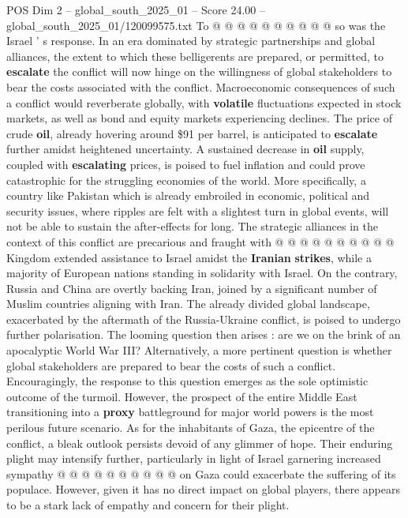 \begin{textsample}{POS Dim 2 – global\_south\_2025\_01 – Score 24.00 – global\_south\_2025\_01/120099575.txt}
To @ @ @ @ @ @ @ @ @ @ so was the Israel ' s response.
In an era dominated by strategic partnerships and global alliances, the extent to which these belligerents are prepared, or permitted, to \textbf{escalate} the conflict will now hinge on the willingness of global stakeholders to bear the costs associated with the conflict.
Macroeconomic consequences of such a conflict would reverberate globally, with \textbf{volatile} fluctuations expected in stock markets, as well as bond and equity markets experiencing declines.
The price of crude \textbf{oil}, already hovering around \$91 per barrel, is anticipated to \textbf{escalate} further amidst heightened uncertainty.
A sustained decrease in \textbf{oil} supply, coupled with \textbf{escalating} prices, is poised to fuel inflation and could prove catastrophic for the struggling economies of the world.
More specifically, a country like Pakistan which is already embroiled in economic, political and security issues, where ripples are felt with a slightest turn in global events, will not be able to sustain the after-effects for long.
The strategic alliances in the context of this conflict are precarious and fraught with @ @ @ @ @ @ @ @ @ @ Kingdom extended assistance to Israel amidst the \textbf{Iranian} \textbf{strikes}, while a majority of European nations standing in solidarity with Israel.
On the contrary, Russia and China are overtly backing Iran, joined by a significant number of Muslim countries aligning with Iran.
The already divided global landscape, exacerbated by the aftermath of the Russia-Ukraine conflict, is poised to undergo further polarisation.
The looming question then arises : are we on the brink of an apocalyptic World War III?
Alternatively, a more pertinent question is whether global stakeholders are prepared to bear the costs of such a conflict.
Encouragingly, the response to this question emerges as the sole optimistic outcome of the turmoil.
However, the prospect of the entire Middle East transitioning into a \textbf{proxy} battleground for major world powers is the most perilous future scenario.
As for the inhabitants of Gaza, the epicentre of the conflict, a bleak outlook persists devoid of any glimmer of hope.
Their enduring plight may intensify further, particularly in light of Israel garnering increased sympathy @ @ @ @ @ @ @ @ @ @ on Gaza could exacerbate the suffering of its populace.
However, given it has no direct impact on global players, there appears to be a stark lack of empathy and concern for their plight.

\end{textsample}
